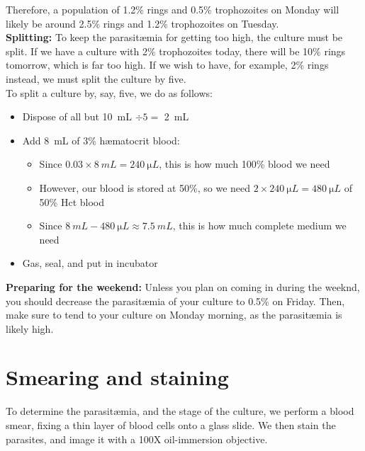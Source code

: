 \documentclass{article}
\begin{document}
Therefore, a population of 1.2\% rings and 0.5\% trophozoites on Monday will likely be around 2.5\% rings and 1.2\% trophozoites on Tuesday.\\

\textbf{Splitting:}
To keep the parasit{\ae}mia for getting too high, the culture must be split. If we have a culture with 2\% trophozoites today, there will be 10\% rings tomorrow, which is far too high. If we wish to have, for example, 2\% rings instead, we must split the culture by five.\\

To split a culture by, say, five, we do as follows:

\begin{itemize}
	\item Dispose of all but \SI{10}{mL} $\div 5 = $ \SI{2}{mL}
	\item Add \SI{8}{mL} of 3\% h{\ae}matocrit blood:
	\begin{itemize}
		\item Since $0.03 \times \SI{8}{mL} = \SI{240}{\micro L}$, this is how much 100\% blood we need
		\item However, our blood is stored at 50\%, so we need $2 \times \SI{240}{\micro L} = \SI{480}{\micro L}$ of 50\% Hct blood
		\item Since $\SI{8}{mL} - \SI{480}{\micro L} \approx \SI{7.5}{mL}$, this is how much complete medium we need
	\end{itemize}
	\item Gas, seal, and put in incubator
\end{itemize}

\textbf{Preparing for the weekend:}
Unless you plan on coming in during the weeknd, you should decrease the parasit{\ae}mia of your culture to 0.5\% on Friday. Then, make sure to tend to your culture on Monday morning, as the parasit{\ae}mia is likely high.

\newpage

\section{Smearing and staining}

To determine the parasit{\ae}mia, and the stage of the culture, we perform a blood smear, fixing a thin layer of blood cells onto a glass slide. We then stain the parasites, and image it with a 100X oil-immersion objective.
\end{document}
